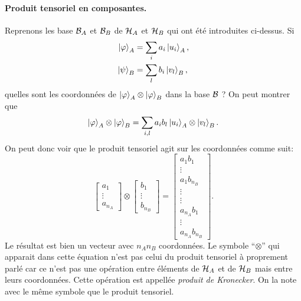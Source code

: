 \documentclass[11pt,a4paper,oneside]{article}
\begin{document}
\paragraph*{Produit tensoriel en composantes.} Reprenons les base $\mathcal{B}_A$ et $\mathcal{B}_B$ de $\mathcal{H}_A$ et $\mathcal{H}_B$ qui ont été introduites ci-dessus. Si
\begin{align}
    \ket{\varphi}_A &= \sum_i a_i\ket{u_i}_A,\\
    \ket{\psi}_B &= \sum_l b_i\ket{v_l}_B,
\end{align}
quelles sont les coordonnées de $\ket{\varphi}_A\otimes\ket{\varphi}_B$ dans la base $\mathcal{B}$ ? On peut montrer que
\begin{equation}
    \ket{\varphi}_A\otimes\ket{\varphi}_B = \sum_{i,l} a_ib_l\ket{u_i}_A\otimes\ket{v_l}_B.
\end{equation}
On peut donc voir que le produit tensoriel agit sur les coordonnées comme suit:
\begin{equation}
    \begin{bmatrix}
        a_1\\
        \vdots\\
        a_{n_A}
    \end{bmatrix}\otimes
    \begin{bmatrix}
        b_1\\
        \vdots\\
        b_{n_B}
    \end{bmatrix}=
    \begin{bmatrix}
        a_1b_1\\
        \vdots\\
        a_1b_{n_B}\\
        \vdots\\
        \vdots\\
        a_{n_A}b_1\\
        \vdots\\
        a_{n_A}b_{n_B}
    \end{bmatrix}.\label{eq:prodKronvecteurs}
\end{equation}
Le résultat est bien un vecteur avec $n_An_B$ coordonnées. Le symbole ``$\otimes$'' qui apparait dans cette équation n'est pas celui du produit tensoriel à proprement parlé car ce n'est pas une opération entre éléments de $\mathcal{H}_A$ et de $\mathcal{H}_B$ mais entre leurs coordonnées. Cette opération est appellée \emph{produit de Kronecker}. On la note avec le même symbole que le produit tensoriel.
\end{document}
